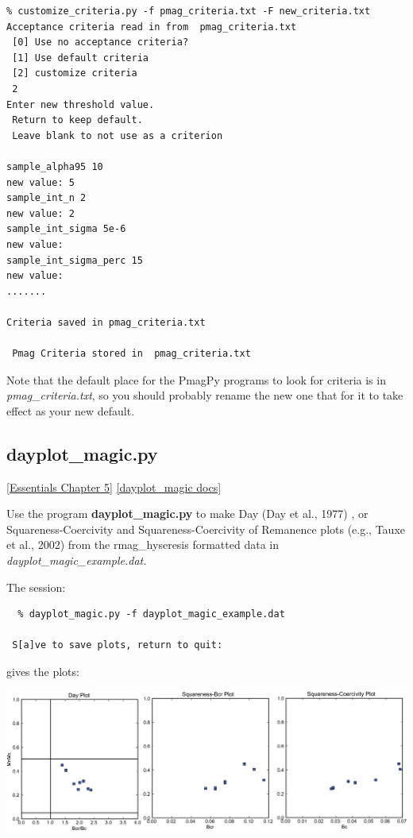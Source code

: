 \documentclass[11pt]{book}
\begin{document}
{{{\begin{verbatim}
% customize_criteria.py -f pmag_criteria.txt -F new_criteria.txt
Acceptance criteria read in from  pmag_criteria.txt
 [0] Use no acceptance criteria?
 [1] Use default criteria
 [2] customize criteria 
 2
Enter new threshold value.
 Return to keep default.
 Leave blank to not use as a criterion
 
sample_alpha95 10
new value: 5
sample_int_n 2
new value: 2
sample_int_sigma 5e-6
new value: 
sample_int_sigma_perc 15
new value: 
.......

Criteria saved in pmag_criteria.txt

 Pmag Criteria stored in  pmag_criteria.txt 

\end{verbatim}

Note that the default place for the PmagPy programs to look for criteria is in {\it pmag\_criteria.txt}, so you should probably rename the new one that for it to take effect as your new default.

%

\subsection{dayplot\_magic.py}
\href{http://magician.ucsd.edu/Essentials_2/WebBook2ch5.html#ch5}{[Essentials Chapter 5]} 
\href{http://earthref.org/PmagPy/pmagpydocs/dayplot_magic-module.html}{[dayplot\_magic docs]}

 Use the program {\bf dayplot\_magic.py}  to make Day (Day et al., 1977) \nocite{day77}, or Squareness-Coercivity and Squareness-Coercivity of Remanence plots (e.g., Tauxe et al., 2002) \nocite{tauxe02} from the rmag\_hyseresis formatted data in {\it dayplot\_magic\_example.dat.}     
 
 The session:
 
  \begin{verbatim}
  % dayplot_magic.py -f dayplot_magic_example.dat

 S[a]ve to save plots, return to quit:  
\end{verbatim}
 

  
\noindent gives the plots:  

{%
  \includegraphics[width=15cm]{EPSfiles/dayplot.eps}}


}}}
\end{document}
